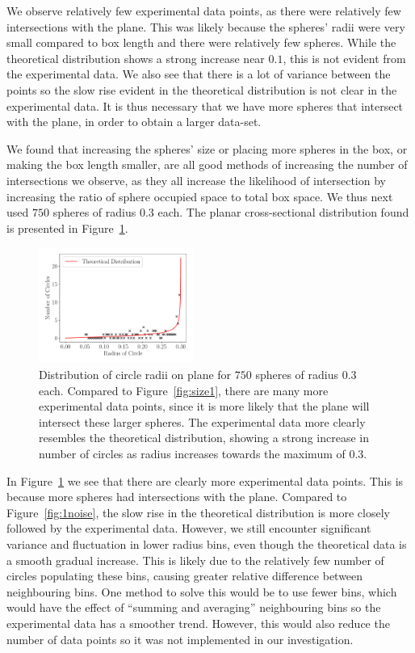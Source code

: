 \documentclass[journal]{IEEEtran}
\begin{document}
We observe relatively few experimental data points, as there were relatively few
intersections with the plane. This was likely because the spheres' radii were
very small compared to box length and there were relatively few spheres. While
the theoretical distribution shows a strong increase near $0.1$, this is not
evident from the experimental data. We also see that there is a lot of variance
between the points so the slow rise evident in the theoretical distribution is
not clear in the experimental data. It is thus necessary that we have more
spheres that intersect with the plane, in order to obtain a larger data-set.

We found that increasing the spheres' size or placing more spheres in the box,
or making the box length smaller, are all good methods of increasing the number
of intersections we observe, as they all increase the likelihood of intersection
by increasing the ratio of sphere occupied space to total box space. We thus
next used $750$ spheres of radius $0.3$ each. The planar cross-sectional
distribution found is presented in Figure~\ref{fig:size3}.

\begin{figure}%
\begin{center}
\includegraphics[width=0.45\textwidth]{./../Figures/750_03.pdf}
\caption{Distribution of circle radii on plane for $750$ spheres of radius $0.3$
  each. Compared to Figure~\ref{fig:size1}, there are many more experimental data
  points, since it is more likely that the plane will intersect these larger
  spheres. The experimental data more clearly resembles the theoretical
  distribution, showing a strong increase in number of circles as radius
  increases towards the maximum of 0.3.}\label{fig:size3}
\end{center}
\end{figure}

In Figure~\ref{fig:size3} we see that there are clearly more experimental data
points. This is because more spheres had intersections with the plane. Compared
to Figure~\ref{fig:1noise}, the slow rise in the theoretical distribution is
more closely followed by the experimental data. However, we still encounter
significant variance and fluctuation in lower radius bins, even though the
theoretical data is a smooth gradual increase. This is likely due to the
relatively few number of circles populating these bins, causing greater relative
difference between neighbouring bins. One method to solve this would be to use
fewer bins, which would have the effect of ``summing and averaging''
neighbouring bins so the experimental data has a smoother trend. However, this
would also reduce the number of data points so it was not implemented in our
investigation.
\end{document}
